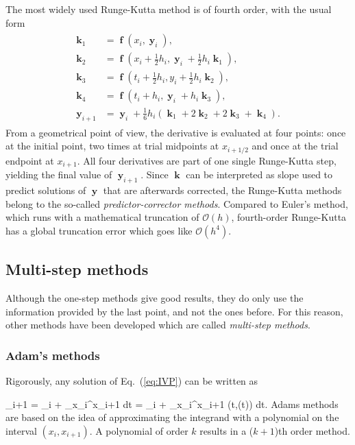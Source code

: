 The most widely used Runge-Kutta method is of fourth order, with the usual form
\begin{align}
\begin{split}
\mathbf{k}_1 &= \mbff(x_i,\mbfy_i),\\
\mathbf{k}_2 &= \mbff(x_i + \frac{1}{2}h_i, \mbfy_i + \frac{1}{2}h_i \mbfk_1),\\
\mbfk_3 &= \mbff(t_i + \frac{1}{2}h_i, y_i + \frac{1}{2}h_i \mbfk_2),\\
\mbfk_4 &= \mbff(t_i + h_i, \mbfy_i + h_i\mbfk_3),\\
\mbfy_{i+1} &= \mbfy_i + \frac{1}{6}h_i (\mbfk_1 + 2\mbfk_2 + 2\mbfk_3 + \mbfk_4).
\end{split}
\end{align}
From a geometrical point of view, the derivative is evaluated at four points: once at the initial point, two times at trial midpoints at $x_{i+1/2}$ and once at the trial endpoint at $x_{i+1}$. All four derivatives are part of one single Runge-Kutta step, yielding the final value of $\mbfy_{i+1}$. Since $\mbfk$ can be interpreted as slope used to predict solutions of $\mbfy$ that are afterwards corrected, the Runge-Kutta methods belong to the so-called \textit{predictor-corrector methods}.
 Compared to Euler's method, which runs with a mathematical truncation of $\mathcal{O}(h)$, fourth-order Runge-Kutta has a global truncation error which goes like $\mathcal{O}(h^4)$.


\subsection{Multi-step methods}
Although the one-step methods give good results, they do only use the information provided by the last point, and not the ones before.  For this reason, other methods have been developed which are called \textit{multi-step methods}.

\subsubsection*{Adam's methods}
Rigorously, any solution of Eq.~(\ref{eq:IVP}) can be written as

\be 
\mbfy_{i+1} = \mbfy_i + \int_{x_i}^{x_{i+1}}  dt = \mbfy_i + \int_{x_i}^{x_{i+1}} \mbff(t,\mbfy(t)) dt.
\label{eq:int1}
\ee
Adams methods are based on the idea of approximating the integrand with a polynomial on the interval $(x_i,x_{i+1})$. A polynomial of order $k$ results in a ($k+1$)th order method. 
\pagebreak[4]

